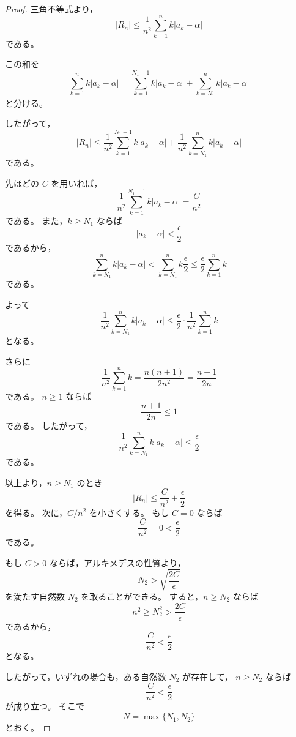 \begin{proof}
    三角不等式より，
    \[
        |R_n|
        \leq
        \frac{1}{n^2}\sum_{k=1}^{n}k|a_k-\alpha|
    \]
    である。

    この和を
    \[
        \sum_{k=1}^{n}k|a_k-\alpha|
        =
        \sum_{k=1}^{N_1-1}k|a_k-\alpha|
        +
        \sum_{k=N_1}^{n}k|a_k-\alpha|
    \]
    と分ける。

    したがって，
    \[
        |R_n|
        \leq
        \frac{1}{n^2}
        \sum_{k=1}^{N_1-1}k|a_k-\alpha|
        +
        \frac{1}{n^2}
        \sum_{k=N_1}^{n}k|a_k-\alpha|
    \]
    である。

    先ほどの $C$ を用いれば，
    \[
        \frac{1}{n^2}
        \sum_{k=1}^{N_1-1}k|a_k-\alpha|
        =
        \frac{C}{n^2}
    \]
    である。
    また，$k\geq N_1$ ならば
    \[
        |a_k-\alpha|<\frac{\epsilon}{2}
    \]
    であるから，
    \[
        \sum_{k=N_1}^{n}k|a_k-\alpha|
        <
        \sum_{k=N_1}^{n}k\frac{\epsilon}{2}
        \leq
        \frac{\epsilon}{2}\sum_{k=1}^{n}k
    \]
    である。

    よって
    \[
        \frac{1}{n^2}
        \sum_{k=N_1}^{n}k|a_k-\alpha|
        \leq
        \frac{\epsilon}{2}
        \cdot
        \frac{1}{n^2}\sum_{k=1}^{n}k
    \]
    となる。

    さらに
    \[
        \frac{1}{n^2}\sum_{k=1}^{n}k
        =
        \frac{n(n+1)}{2n^2}
        =
        \frac{n+1}{2n}
    \]
    である。
    $n\geq 1$ ならば
    \[
        \frac{n+1}{2n}\leq 1
    \]
    である。
    したがって，
    \[
        \frac{1}{n^2}
        \sum_{k=N_1}^{n}k|a_k-\alpha|
        \leq
        \frac{\epsilon}{2}
    \]
    である。

    以上より，$n\geq N_1$ のとき
    \[
        |R_n|
        \leq
        \frac{C}{n^2}
        +
        \frac{\epsilon}{2}
    \]
    を得る。
    次に，$C/n^2$ を小さくする。
    もし $C=0$ ならば
    \[
        \frac{C}{n^2}=0<\frac{\epsilon}{2}
    \]
    である。

    もし $C>0$ ならば，アルキメデスの性質より，
    \[
        N_2>\sqrt{\frac{2C}{\epsilon}}
    \]
    を満たす自然数 $N_2$ を取ることができる。
    すると，$n\geq N_2$ ならば
    \[
        n^2\geq N_2^2>\frac{2C}{\epsilon}
    \]
    であるから，
    \[
        \frac{C}{n^2}<\frac{\epsilon}{2}
    \]
    となる。

    したがって，いずれの場合も，ある自然数 $N_2$ が存在して，
    $n\geq N_2$ ならば
    \[
        \frac{C}{n^2}<\frac{\epsilon}{2}
    \]
    が成り立つ。
    そこで
    \[
        N=\max\{N_1,N_2\}
    \]
    とおく。


\end{proof}

